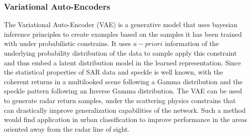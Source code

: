 \subsubsection*{Variational Auto-Encoders}
The Variational Auto-Encoder (VAE) is a generative model that uses bayesian inference principles to create examples based on the samples it has been trained with under probabilistic constrains. It uses $a-priori$ information of the underlying probability distribution of the data to sample apply this constraint and thus embed a latent distribution model in the learned representation. Since the statistical properties of SAR data and speckle is well known, with the coherent returns in a multilooked scene following a Gamma distribution and the speckle pattern following an Inverse Gamma distribution. The VAE can be used to generate radar return samples, under the scattering physics constrains that can drastically improve generalization capabilities of the network. Such a method would find application in urban classification to improve performance in the areas oriented away from the radar line of sight. 


